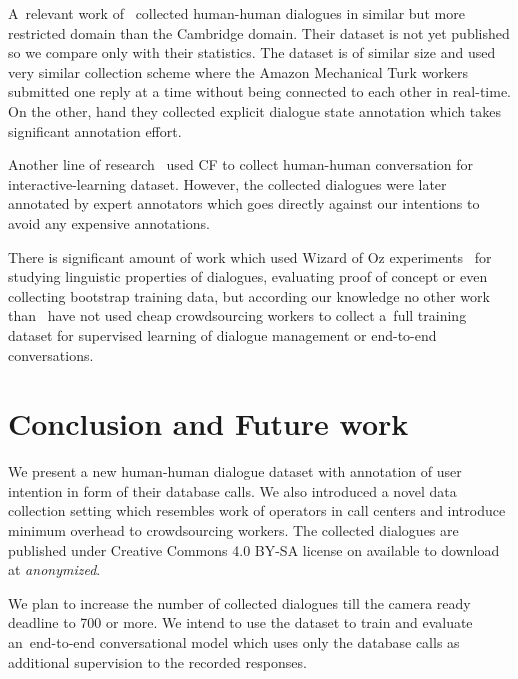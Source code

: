 \documentclass[runningheads,a4paper]{llncs}
\def\OD#1{{\color{darkgreen}OD: \it #1}}
\begin{document}
A~relevant work of~\cite{wen2016network} collected human-human dialogues in similar but more restricted domain than the Cambridge domain.
Their dataset is not yet published so we compare only with their statistics.
The dataset is of similar size and used very similar collection scheme where the Amazon Mechanical Turk workers submitted one reply at a time without being connected to each other in real-time.
On the other, hand they collected explicit dialogue state annotation which takes significant annotation effort.

Another line of research~\cite{vodolan2016data} used CF to collect human-human conversation for interactive-learning dataset.
However, the collected dialogues were later annotated by expert annotators which goes directly against our intentions to avoid any expensive annotations.

There is significant amount of work which used Wizard of Oz experiments~\cite{whittaker2002fish,walker1997evaluating,rieser2008learning} for studying linguistic properties of dialogues, evaluating proof of concept or even collecting bootstrap training data, but according our knowledge no other work than~\cite{wen2016network} have not used cheap crowdsourcing workers to collect a~full training dataset for supervised learning of dialogue management or end-to-end conversations.

\section{Conclusion and Future work} \label{sec:conc}
\vspace{-0.50em}
We present a new human-human dialogue dataset with annotation of user intention in form of their database calls.
We also introduced a novel data collection setting which resembles work of operators in call centers and introduce minimum overhead to crowdsourcing workers.
The collected dialogues are published under Creative Commons 4.0 BY-SA license on available to download at {\it anonymized}.  %

We plan to increase the number of collected dialogues till the camera ready deadline to 700 or more.
We intend to use the dataset to train and evaluate an~end-to-end conversational model which uses only the database calls as additional supervision to the recorded responses. 

\vspace{-1.40em}
\end{document}
